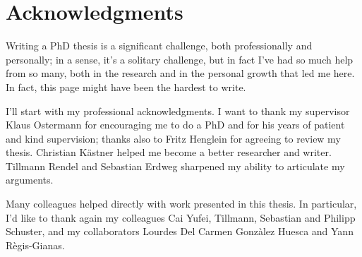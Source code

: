 
\chapter{Acknowledgments}
Writing a PhD thesis is a significant challenge, both professionally and
personally; in a sense, it's a solitary challenge, but in fact I've had so much
help from so many, both in the research and in the personal growth that led me
here. In fact, this page might have been the hardest to write.

I'll start with my professional acknowledgments. I want to thank my supervisor
Klaus Ostermann for encouraging me to do a PhD and for his years of patient and
kind supervision; thanks also to Fritz Henglein for agreeing to review my
thesis. Christian Kästner helped me become a better researcher and writer.
Tillmann Rendel and Sebastian Erdweg sharpened my ability to articulate my
arguments.

Many colleagues helped directly with work presented in this thesis. In
particular, I'd like to thank again my colleagues Cai Yufei, Tillmann, Sebastian
and Philipp Schuster, and my collaborators Lourdes Del Carmen Gonzàlez Huesca and
Yann Règis-Gianas.







